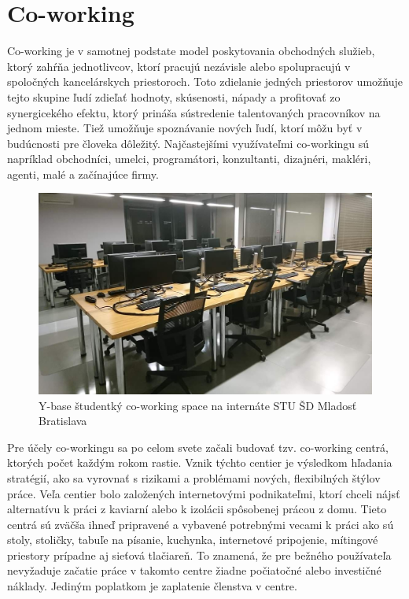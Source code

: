 \section{Co-working}
\indent Co-working je v samotnej podstate model poskytovania obchodných služieb, ktorý zahŕňa jednotlivcov, ktorí pracujú nezávisle alebo spolupracujú v spoločných kancelárskych priestoroch. Toto zdielanie jedných priestorov umožňuje tejto skupine ľudí zdieľať hodnoty, skúsenosti, nápady a profitovať zo synergicekého efektu, ktorý prináša sústredenie talentovaných pracovníkov na jednom mieste. Tiež umožňuje spoznávanie nových ľudí, ktorí môžu byť v budúcnosti pre človeka dôležitý. Najčastejšími využívateľmi co-workingu sú napríklad obchodníci, umelci, programátori, konzultanti, dizajnéri, makléri, agenti, malé a začínajúce firmy.

\begin{figure}[H]
    \centering
    \includegraphics[scale=0.40]{img/ybase.jpg}
    \caption{Y-base študentký co-working space na internáte STU ŠD Mladosť Bratislava}
    \label{fig:img-ybase}
\end{figure}

\indent Pre účely co-workingu sa po celom svete začali budovať tzv. co-working centrá, ktorých počet každým rokom rastie. Vznik týchto centier je výsledkom hľadania stratégií, ako sa vyrovnať s rizikami a problémami nových, flexibilných štýlov práce. Veľa centier bolo založených internetovými podnikateľmi, ktorí chceli nájsť alternatívu k práci z kaviarní alebo k izolácii spôsobenej prácou z domu. Tieto centrá sú zväčša ihneď pripravené a vybavené potrebnými vecami k práci ako sú stoly, stoličky, tabuľe na písanie, kuchynka, internetové pripojenie, mítingové priestory prípadne aj sieťová tlačiareň. To znamená, že pre bežného používateľa nevyžaduje začatie práce v takomto centre žiadne počiatočné alebo investičné náklady. Jediným poplatkom je zaplatenie členstva v centre. 


